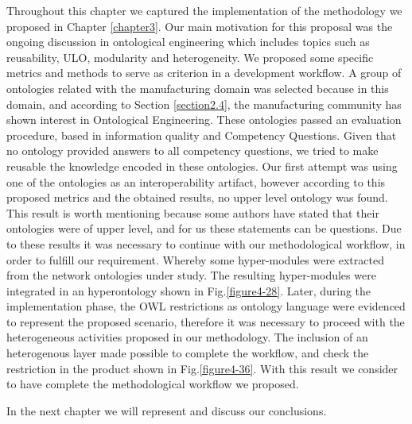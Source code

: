 Throughout this chapter we captured the implementation of the methodology we proposed in Chapter \ref{chapter3}. Our main motivation for this proposal was the ongoing discussion in ontological engineering which includes topics such as reusability, ULO, modularity and heterogeneity. We proposed some specific metrics and methods to serve as criterion in a development workflow. A group of ontologies related with the manufacturing domain was selected because in this domain, and according to Section \ref{section2.4}, the manufacturing community has shown interest in Ontological Engineering.  These ontologies passed an evaluation procedure, based in information quality and Competency Questions. Given that no ontology provided answers to all competency questions, we tried to make reusable the knowledge encoded in these ontologies. Our first attempt was using one of the ontologies as an interoperability artifact, however according to this proposed metrics and the obtained results, no upper level ontology was found. This result is worth mentioning because some authors have stated that their ontologies were of upper level, and for us these statements can be questions. \cbstart Due to these results it was necessary to continue with our methodological workflow, in order to  fulfill our requirement. Whereby some hyper-modules were extracted from the network ontologies under study. The resulting hyper-modules were integrated in an hyperontology shown in Fig.\ref{figure4-28}. Later, during the implementation phase, the OWL restrictions as ontology language were evidenced to represent the proposed scenario, therefore it was necessary to proceed with the heterogeneous activities proposed in our methodology. The inclusion of an heterogenous layer made possible to complete the workflow, and check the restriction in the product shown in Fig.\ref{figure4-36}. With this result we consider to have complete the methodological workflow we proposed.\cbend


In the next chapter we will represent and discuss our conclusions.  














